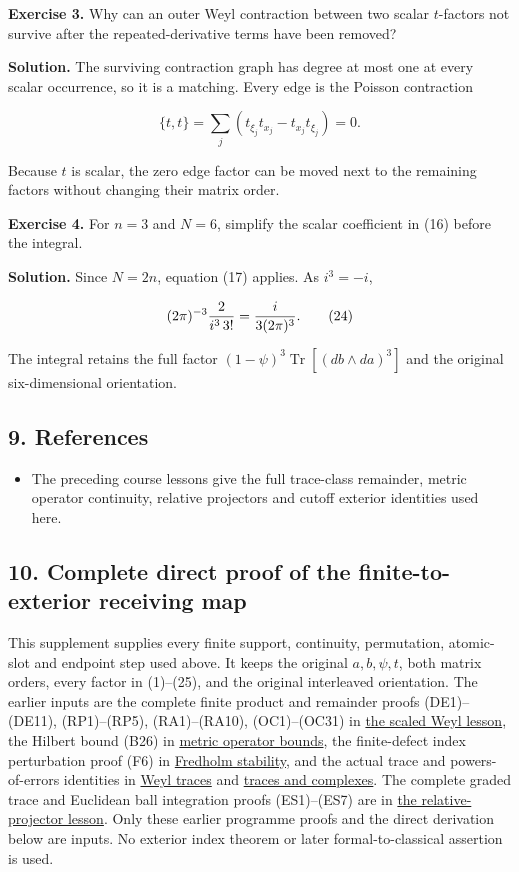 \documentclass[
  11pt,
]{article}
\providecommand{\tightlist}{%
  \setlength{\itemsep}{0pt}\setlength{\parskip}{0pt}}
\begin{document}
\textbf{Exercise 3.} Why can an outer Weyl contraction between two
scalar \(t\)-factors not survive after the repeated-derivative terms
have been removed?

\textbf{Solution.} The surviving contraction graph has degree at most
one at every scalar occurrence, so it is a matching. Every edge is the
Poisson contraction

\[
 \{t,t\}=\sum_j(t_{\xi_j}t_{x_j}-t_{x_j}t_{\xi_j})=0.
 \tag{23}
\]

Because \(t\) is scalar, the zero edge factor can be moved next to the
remaining factors without changing their matrix order.

\textbf{Exercise 4.} For \(n=3\) and \(N=6\), simplify the scalar
coefficient in (16) before the integral.

\textbf{Solution.} Since \(N=2n\), equation (17) applies. As \(i^3=-i\),

\[
 (2\pi)^{-3}{2\over i^3\,3!}
  ={i\over3(2\pi)^3}.
 \tag{24}
\]

The integral retains the full factor
\((1-\psi)^3\operatorname{Tr}[(db\wedge da)^3]\) and the original
six-dimensional orientation.

\subsection{9. References}\label{references}

\begin{itemize}
\tightlist
\item
  The preceding course lessons give the full trace-class remainder,
  metric operator continuity, relative projectors and cutoff exterior
  identities used here.
\end{itemize}

\subsection{10. Complete direct proof of the finite-to-exterior
receiving
map}\label{complete-direct-proof-of-the-finite-to-exterior-receiving-map}

This supplement supplies every finite support, continuity, permutation,
atomic-slot and endpoint step used above. It keeps the original
\(a,b,\psi,t\), both matrix orders, every factor in (1)--(25), and the
original interleaved orientation. The earlier inputs are the complete
finite product and remainder proofs (DE1)--(DE11), (RP1)--(RP5),
(RA1)--(RA10), (OC1)--(OC31) in \href{scaled-weyl-index-degree.pdf}{the
scaled Weyl lesson}, the Hilbert bound (B26) in
\href{metric-operator-bounds.pdf}{metric operator bounds}, the
finite-defect index perturbation proof (F6) in
\href{fredholm-stability.pdf}{Fredholm stability}, and the actual trace
and powers-of-errors identities in \href{weyl-trace-criterion.pdf}{Weyl
traces} and \href{traces-and-complexes.pdf}{traces and complexes}. The
complete graded trace and Euclidean ball integration proofs (ES1)--(ES7)
are in \href{relative-projectors-chern-cutoff.pdf}{the relative-projector
lesson}. Only these earlier programme proofs and the direct derivation
below are inputs. No exterior index theorem or later formal-to-classical
assertion is used.
\end{document}
